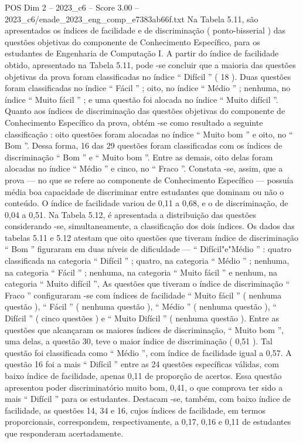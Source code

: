 \begin{textsample}{POS Dim 2 – 2023\_c6 – Score 3.00 – 2023\_c6/enade\_2023\_eng\_comp\_e7383ab66f.txt}
Na Tabela 5.11, são apresentados os índices de facilidade e de discriminação ( ponto-bisserial ) das questões objetivas do componente de Conhecimento Específico, para os estudantes de Engenharia de Computação I.
A partir do índice de facilidade obtido, apresentado na Tabela 5.11, pode -se concluir que a maioria das questões objetivas da prova foram classificadas no índice “ Difícil ” ( 18 ).
Duas questões foram classificadas no índice “ Fácil ” ; oito, no índice “ Médio ” ; nenhuma, no índice “ Muito fácil ” ; e uma questão foi alocada no índice “ Muito difícil ”.
Quanto aos índices de discriminação das questões objetivas do componente de Conhecimento Específico da prova, obtém -se como resultado a seguinte classificação : oito questões foram alocadas no índice “ Muito bom ” e oito, no “ Bom ”.
Dessa forma, 16 das 29 questões foram classificadas com os índices de discriminação “ Bom ” e “ Muito bom ”.
Entre as demais, oito delas foram alocadas no índice “ Médio ” e cinco, no “ Fraco ”.
Constata -se, assim, que a prova — no que se refere ao componente de Conhecimento Específico — possuía média boa capacidade de discriminar entre estudantes que dominam ou não o conteúdo.
O índice de facilidade variou de 0,11 a 0,68, e o de discriminação, de 0,04 a 0,51.
Na Tabela 5.12, é apresentada a distribuição das questões considerando -se, simultaneamente, a classificação dos dois índices.
Os dados das tabelas 5.11 e 5.12 atestam que oito questões que tiveram índice de discriminação “ Bom ” figuraram em duas níveis de dificuldade — “ Difícil"e"Médio ” : quatro classificada na categoria “ Difícil ” ; quatro, na categoria “ Médio ” ; nenhuma, na categoria “ Fácil ” ; nenhuma, na categoria “ Muito fácil ” e nenhum, na categoria “ Muito difícil ”, As questões que tiveram o índice de discriminação “ Fraco ” configuraram -se com índices de facilidade “ Muito fácil ” ( nenhuma questão ), “ Fácil ” ( nenhuma questão ), “ Médio ” ( nenhuma questão ), “ Difícil ” ( cinco questões ) e “ Muito Difícil ” ( nenhuma questão ).
Entre as questões que alcançaram os maiores índices de discriminação, “ Muito bom ”, uma delas, a questão 30, teve o maior índice de discriminação ( 0,51 ).
Tal questão foi classificada como “ Médio ”, com índice de facilidade igual a 0,57.
A questão 16 foi a mais “ Difícil ” entre as 24 questões específicas válidas, com baixo índice de facilidade, apenas 0,11 de proporção de acertos.
Essa questão apresentou poder discriminatório muito bom, 0,41, o que comprova ter sido a mais “ Difícil ” para os estudantes.
Destacam -se, também, com baixo índice de facilidade, as questões 14, 34 e 16, cujos índices de facilidade, em termos proporcionais, correspondem, respectivamente, a 0,17, 0,16 e 0,11 de estudantes que responderam acertadamente.

\end{textsample}
